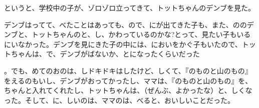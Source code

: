 というと、学校中の子が、ゾロゾロ立ってきて、トットちゃんのデンブを見た。

デンブはってて、べたことはあっても、ので、にが出てきた子も、また、ののデンブと、トットちゃんのと、し、かわっているのかな?とって、見たい子もいるにいなかった。デンブを見にきた子の中には、においをかぐ子もいたので、トットちゃんは、で、デンブがばないか、とになったくらいだった

。でも、めてのおのは、しドキドキはしたけど、しくて、『のものと山のもの』をえるのもいし、デンブがおってかったし、ママは、『のものと山のもの』を、ちゃんと入れてくれたし、トットちゃんは、（ぜんぶ、よかったな）と、しくなった。そして、に、しいのは、ママのは、べると、おいしいことだった。


